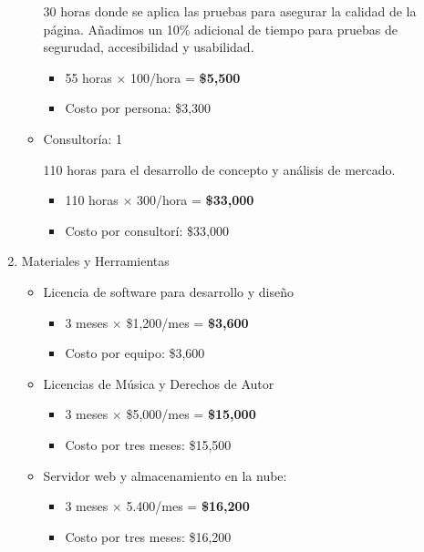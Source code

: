\documentclass[12pt]{article}
\begin{document}
\begin{enumerate}
\begin{itemize}
         30 horas donde se aplica las pruebas para asegurar la calidad de la página. Añadimos un 10\% adicional de tiempo para pruebas de segurudad, accesibilidad y usabilidad.
          \begin{itemize}
            \item 55 horas $\times$ 100/hora = \textbf{\$5,500}
            \item Costo por persona: \$3,300
            \end{itemize}

		\item Consultoría: 1

          110 horas para el desarrollo de concepto y análisis de mercado.
            \begin{itemize}
            \item 110 horas $\times$ 300/hora = \textbf{\$33,000}
            \item Costo por consultorí: \$33,000
            \end{itemize}

	\end{itemize}

	\newpage

	\item Materiales y Herramientas

	\begin{itemize}
		\item Licencia de software para desarrollo y diseño
        \begin{itemize}
            \item 3 meses $\times$ \$1,200/mes = \textbf{\$3,600}
            \item Costo por equipo: \$3,600
        \end{itemize}

		\item Licencias de Música y Derechos de Autor
        \begin{itemize}
            \item 3 meses $\times$ \$5,000/mes = \textbf{\$15,000}
            \item Costo por tres meses: \$15,500
        \end{itemize}

		\item Servidor web y almacenamiento en la nube:
        \begin{itemize}
            \item 3 meses $\times$ 5.400/mes = \textbf{\$16,200}
            \item Costo por tres meses: \$16,200
        \end{itemize}


\end{itemize}
\end{enumerate}
\end{document}

